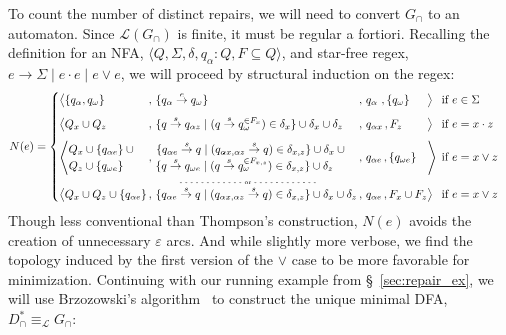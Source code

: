 \documentclass[popl.tex]{subfiles}
\begin{document}
To count the number of distinct repairs, we will need to convert $G_\cap$ to an automaton. Since $\mathcal{L}(G_\cap)$ is finite, it must be regular a fortiori. Recalling the definition for an NFA, $\langle Q, \Sigma, \delta, q_\alpha: Q, F \subseteq Q \rangle$, and star-free regex, $e \rightarrow \Sigma \mid e \cdot e \mid e \lor e$, we will proceed by structural induction on the regex:
\begin{equation*}
N(e) =
\begin{cases}
  \begin{alignedat}{8}
    &\big\langle \{q_\alpha, q_\omega\}
    &&\,,\, \{ q_\alpha \overset{e}{\rightarrow} q_\omega \}
    &&\,,\, q_\alpha\,\,, \{q_{\omega}\}
    &&\big\rangle
    &&\:\: \text{if } e \in \Sigma \\[0.5em]

    &\big\langle Q_{x} \cup Q_{z}
    &&\,,\, \{ q \overset{s}{\rightarrow} q_{\alpha z} \mid (q \overset{s}{\rightarrow} q_{\omega}^{\in F_x}) \in \delta_x \} \cup \delta_{x} \cup \delta_{z}
    &&\,,\, q_{\alpha x}\,, F_{z}
    &&\big\rangle
    &&\:\: \text{if } e = x \cdot z \\[0.5em]

    &\Bigg\langle   \begin{matrix} Q_{x}\cup \{q_{\alpha e}\}\:\cup\\ Q_{z} \cup \{q_{\omega e}\}\phantom{\:\cup} \end{matrix}
    &&\,,\, \begin{matrix}\{ q_{\alpha e} \overset{s}{\rightarrow} q \mid (q_{\alpha x, \alpha z} \overset{s}{\rightarrow} q)\in \delta_{x, z} \} \cup \delta_{x}\:\cup\\
    \{ q \overset{s}{\rightarrow} q_{\omega e} \mid (q \overset{s}{\rightarrow} q_{\omega}^{\in F_{x,z}})\in \delta_{x, z} \}\cup \delta_{z}\phantom{\,\:\cup}\end{matrix}
    &&\,,\, q_{\alpha e}\,, \{q_{\omega e}\}
    &&\Bigg\rangle
    &&\:\:\text{if } e = x \lor z\hspace{-0.5cm}\\[-0.5em]
    \multicolumn{9}{c}{\tiny{\text{- - - - - - - - - - - - or - - - - - - - - - - - -}}} \\[-0.5em]
    &\big\langle Q_{x} \cup Q_{z} \cup \{q_{\alpha e}\}
    &&\,,\, \{ q_{\alpha e} \overset{s}{\rightarrow} q \mid (q_{\alpha x, \alpha z} \overset{s}{\rightarrow} q) \in \delta_{x, z} \}  \cup \delta_{x} \cup \delta_{z}
    &&\,,\, q_{\alpha e}\,, F_{x} \cup F_{z}
    &&\big\rangle
    &&\:\: \text{if } e = x \lor z
  \end{alignedat}
\end{cases}\vspace{0.2cm}
\end{equation*}
Though less conventional than Thompson's construction, $N(e)$ avoids the creation of unnecessary $\varepsilon$ arcs. And while slightly more verbose, we find the topology induced by the first version of the $\lor$ case to be more favorable for minimization. Continuing with our running example from \S~\ref{sec:repair_ex}, we will use Brzozowski's algorithm~\cite{brzozowski1962canonical} to construct the unique minimal DFA, $D^*_\cap \equiv_\mathcal{L} G_\cap$: \vspace{-0.4cm}
\end{document}
